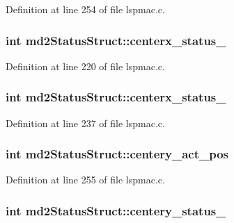Definition at line 254 of file lspmac.\-c.

\hypertarget{structmd2StatusStruct_aa619cdbd7a563408c6b825ddc4f74ebb}{
\subsubsection[{centerx\-\_\-status\-\_\-1}]{\setlength{\rightskip}{0pt plus 5cm}int md2\-Status\-Struct\-::centerx\-\_\-status\-\_}}\label{structmd2StatusStruct_aa619cdbd7a563408c6b825ddc4f74ebb}


Definition at line 220 of file lspmac.\-c.

\hypertarget{structmd2StatusStruct_ae4fad6debe138ed7815d463e83f8d0f6}{
\subsubsection[{centerx\-\_\-status\-\_\-2}]{\setlength{\rightskip}{0pt plus 5cm}int md2\-Status\-Struct\-::centerx\-\_\-status\-\_}}\label{structmd2StatusStruct_ae4fad6debe138ed7815d463e83f8d0f6}


Definition at line 237 of file lspmac.\-c.

\hypertarget{structmd2StatusStruct_a6be71a92a599d490ca808af8c7e7faa0}{
\subsubsection[{centery\-\_\-act\-\_\-pos}]{\setlength{\rightskip}{0pt plus 5cm}int md2\-Status\-Struct\-::centery\-\_\-act\-\_\-pos}}\label{structmd2StatusStruct_a6be71a92a599d490ca808af8c7e7faa0}


Definition at line 255 of file lspmac.\-c.

\hypertarget{structmd2StatusStruct_a57f65ebe28ef88f1c632d9f35d9167eb}{
\subsubsection[{centery\-\_\-status\-\_\-1}]{\setlength{\rightskip}{0pt plus 5cm}int md2\-Status\-Struct\-::centery\-\_\-status\-\_}}\label{structmd2StatusStruct_a57f65ebe28ef88f1c632d9f35d9167eb}


